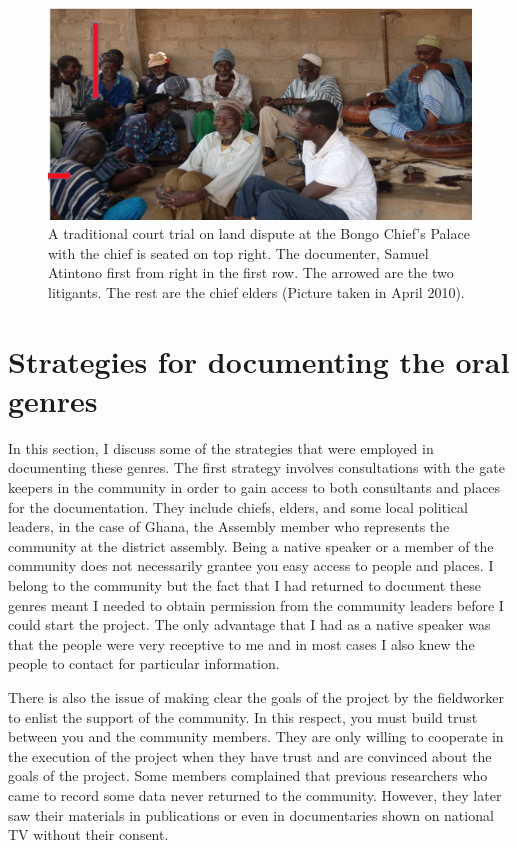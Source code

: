 \documentclass[output=paper,colorlinks,citecolor=brown]{langscibook}
\begin{document}
\begin{figure}
\includegraphics[scale=0.55]{figures/bongo.png}
\caption{A traditional court trial on land dispute at the Bongo Chief’s Palace with the chief is seated 
 	on top right. The documenter, Samuel Atintono first from right in the first row. The arrowed are the 
 	two litigants. The rest are the chief elders (Picture taken in April 2010).}

\end{figure}


\section{Strategies for documenting the oral genres}

In this section, I discuss some of the strategies that were employed in documenting these genres. The first strategy involves consultations with the gate keepers in the community in order to gain access to both consultants and places for the documentation. They include chiefs, elders,  and some local political leaders,  in the case of Ghana, the Assembly member who represents the community at the district assembly. Being a native speaker or a member of the community does not necessarily grantee you easy access to people and places. I belong to the community but the fact that I had returned to document these genres meant I needed to obtain permission from the community leaders before I could start the project. The only advantage that I had as a native speaker was that the people were very receptive to me and in most cases I also knew the people to contact for particular information. 

There is also the issue of making clear the goals of the project by the fieldworker to enlist the support of the community. In this respect, you must build trust between you and the community members. They are only willing to cooperate in the execution of the project when they have trust and are convinced about the goals of the project. Some members complained that previous researchers who came to record some data never returned to the community. However, they later saw their materials in publications or even in documentaries shown on national TV without their consent.
\end{document}
